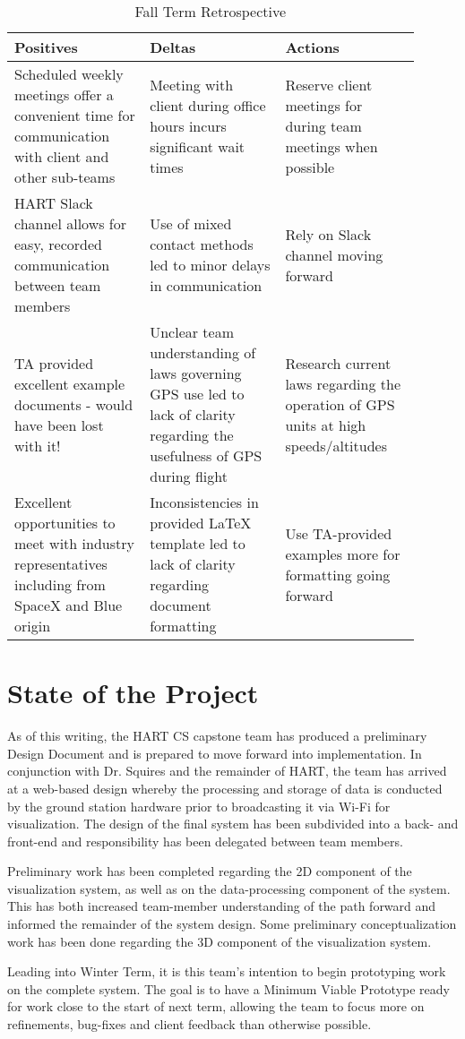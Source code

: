 \documentclass[journal,10pt,onecolumn,compsoc]{IEEEtran}
\begin{document}
\begin{center}
\begin{table}[h!]
\begin{tabular}{|p{0.3\linewidth}|p{0.3\linewidth}|p{0.3\linewidth}|} 
	\hline
	\textbf{Positives} & \textbf{Deltas} & \textbf{Actions} \\
	\hline
	Scheduled weekly meetings offer a convenient time for communication with client and other sub-teams & Meeting with client during office hours incurs significant wait times & Reserve client meetings for during team meetings when possible \\ 
	\hline
	HART Slack channel allows for easy, recorded communication between team members & Use of mixed contact methods led to minor delays in communication & Rely on Slack channel moving forward \\ 
	\hline
	TA provided excellent example documents - would have been lost with it! & Unclear team understanding of laws governing GPS use led to lack of clarity regarding the usefulness of GPS during flight  & Research current laws regarding the operation of GPS units at high speeds/altitudes \\
	\hline
	Excellent opportunities to meet with industry representatives including from SpaceX and Blue origin & Inconsistencies in provided LaTeX template led to lack of clarity regarding document formatting & Use TA-provided examples more for formatting going forward \\
	\hline
\end{tabular}
\caption{Fall Term Retrospective}
\label{table:1}
\end{table}
\end{center}
\newpage

\section{State of the Project}
	As of this writing, the HART CS capstone team has produced a preliminary Design Document and is prepared to move forward into implementation.
	In conjunction with Dr. Squires and the remainder of HART, the team has arrived at a web-based design whereby the processing and storage of data is conducted by the ground station hardware prior to broadcasting it via Wi-Fi for visualization.
	The design of the final system has been subdivided into a back- and front-end and responsibility has been delegated between team members.
	
	\noindent Preliminary work has been completed regarding the 2D component of the visualization system, as well as on the data-processing component of the system.
	This has both increased team-member understanding of the path forward and informed the remainder of the system design.
	Some preliminary conceptualization work has been done regarding the 3D component of the visualization system.
	
	\noindent Leading into Winter Term, it is this team's intention to begin prototyping work on the complete system.
	The goal is to have a Minimum Viable Prototype ready for work close to the start of next term, allowing the team to focus more on refinements, bug-fixes and client feedback than otherwise possible.
	
\end{document}
